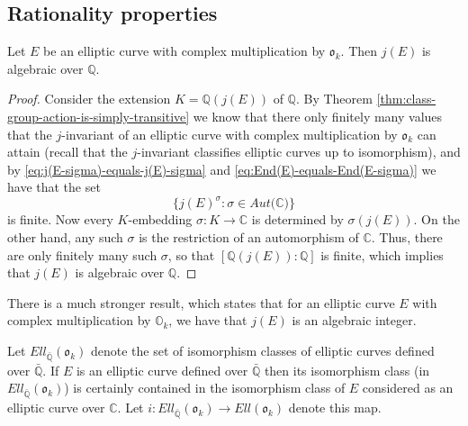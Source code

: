 \subsection{Rationality properties}
\label{sec:rationality-properties}

\begin{prop}
  \label{prop:j(E)-is-in-Qbar}
  Let $E$ be an elliptic curve with complex multiplication by $\mathfrak{o}_{k}$.
  Then $j(E)$ is algebraic over $\mathbb{Q}$.
\end{prop}
\begin{proof}
  Consider the extension $K = \mathbb{Q}(j(E))$ of $\mathbb{Q}$.  By Theorem
  \ref{thm:class-group-action-is-simply-transitive} we know that there only finitely
  many values that the $j$-invariant of an elliptic curve with complex multiplication
  by $\mathfrak{o}_{k}$ can attain (recall that the $j$-invariant classifies elliptic
  curves up to isomorphism), and by \eqref{eq:j(E-sigma)-equals-j(E)-sigma} and
  \eqref{eq:End(E)-equals-End(E-sigma)} we have that the set
  \begin{equation*}
    \{ j(E)^{\sigma} : \sigma \in Aut(\mathbb{C)} \}
  \end{equation*}
  is finite.  Now every $K$-embedding $\sigma : K \rightarrow \mathbb{C}$ is
  determined by $\sigma (j(E))$.  On the other hand, any such $\sigma$ is the
  restriction of an automorphism of $\mathbb{C}$.  Thus, there are only finitely many
  such $\sigma$, so that $[\mathbb{Q}(j(E)) : \mathbb{Q}]$ is finite, which implies
  that $j(E)$ is algebraic over $\mathbb{Q}$.
\end{proof}
\begin{rem}
  \label{rem:j(E)-is-integral}
  There is a much stronger result, which states that for an elliptic curve $E$ with
  complex multiplication by $\mathbb{O}_{k}$, we have that $j(E)$ is an algebraic
  integer.
\end{rem}

Let $Ell_{\bar{\mathbb{Q}}}(\mathfrak{o}_{k})$ denote the set of isomorphism classes
of elliptic curves defined over $\bar{\mathbb{Q}}$.  If $E$ is an elliptic curve
defined over $\bar{\mathbb{Q}}$ then its isomorphism class (in
$Ell_{\bar{\mathbb{Q}}}(\mathfrak{o}_{k})$) is certainly contained in the isomorphism
class of $E$ considered as an elliptic curve over $\mathbb{C}$. Let $i :
Ell_{\bar{\mathbb{Q}}}(\mathfrak{o}_{k}) \rightarrow Ell(\mathfrak{o}_{k})$ denote
this map.

